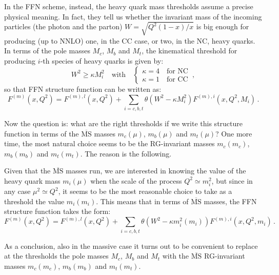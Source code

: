 \documentclass[10pt,a4paper]{article}
\begin{document}
In the FFN scheme, instead, the heavy quark mass thresholds assume a precise physical meaning. In fact, they tell us whether the invariant mass of the incoming particles (the photon and the parton) $W=\sqrt{Q^2(1-x)/x}$ is big enough for producing (up to NNLO) one, in the CC case, or two, in the NC, heavy quarks. In terms of the pole masses $M_c$, $M_b$ and $M_t$, the kinematical threshold for producing $i$-th species of heavy quarks is given by:
\begin{equation}
W^2\geq \kappa M_i^2\quad\mbox{with}\quad
\left\{\begin{array}{l}
\kappa = 4\quad\mbox{for NC}\\
\kappa = 1\quad\mbox{for CC}
\end{array}\right.\,,
\end{equation}
so that FFN structure function can be written as:
\begin{equation}
F^{(m)}(x,Q^2) = F^{(m),l}(x,Q^2)+\sum_{i=c,b,t}\theta(W^2-\kappa M_i^2)F^{(m),i}(x,Q^2,M_i)\,.
\end{equation}

Now the question is: what are the right thresholds if we write this structure function in terms of the $\overline{\mbox{MS}}$ masses $m_c(\mu)$, $m_b(\mu)$ and $m_t(\mu)$? One more time, the most natural choice seems to be the RG-invariant masses  $m_c(m_c)$, $m_b(m_b)$ and $m_t(m_t)$. The reason is the following. 

Given that the $\overline{\mbox{MS}}$ masses run, we are interested in knowing the value of the heavy quark mass $m_i(\mu)$ when the scale of the process $Q^2\simeq m_i^2$, but since in any case $\mu^2\simeq Q^2$, it seems to be the most reasonable choice to take as a threshold the value $m_i(m_i)$. This means that in terms of $\overline{\mbox{MS}}$ masses, the FFN structure function takes the form:
\begin{equation}
F^{(m)}(x,Q^2) = F^{(m),l}(x,Q^2)+\sum_{i=c,b,t}\theta(W^2-\kappa m_i^2(m_i))F^{(m),i}(x,Q^2,m_i)\,.
\end{equation}

As a conclusion, also in the massive case it turns out to be convenient to replace at the thresholds the pole masses $M_c$, $M_b$ and $M_t$ with the $\overline{\mbox{MS}}$ RG-invariant masses $m_c(m_c)$, $m_b(m_b)$ and $m_t(m_t)$.



%
\end{document}
